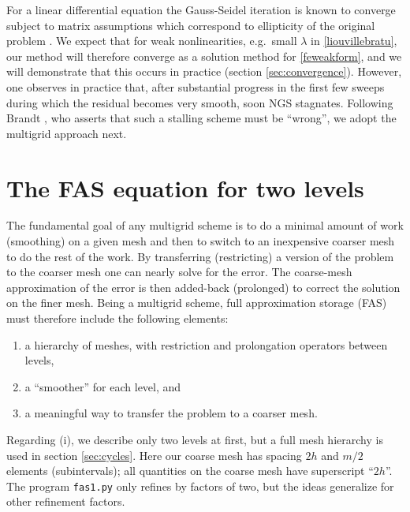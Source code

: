 \documentclass[letterpaper,final,12pt,reqno]{amsart}
\begin{document}
For a linear differential equation the Gauss-Seidel iteration is known to converge subject to matrix assumptions which correspond to ellipticity of the original problem \cite[for example]{Greenbaum1997}.  We expect that for weak nonlinearities, e.g.~small $\lambda$ in \eqref{liouvillebratu}, our method will therefore converge as a solution method for \eqref{feweakform}, and we will demonstrate that this occurs in practice (section \ref{sec:convergence}).  However, one observes in practice that, after substantial progress in the first few sweeps during which the residual becomes very smooth, soon NGS stagnates.  Following Brandt \cite{Brandt1977,BrandtLivne2011}, who asserts that such a stalling scheme must be ``wrong'', we adopt the multigrid approach next.


\section{The FAS equation for two levels}  \label{sec:fastwolevel}

The fundamental goal of any multigrid scheme is to do a minimal amount of work (smoothing) on a given mesh and then to switch to an inexpensive coarser mesh to do the rest of the work.  By transferring (restricting) a version of the problem to the coarser mesh one can nearly solve for the error.  The coarse-mesh approximation of the error is then added-back (prolonged) to correct the solution on the finer mesh.  Being a multigrid scheme, full approximation storage (FAS) \cite{Brandt1977,Briggsetal2000} must therefore include the following elements:
\renewcommand{\labelenumi}{(\roman{enumi})}
\begin{enumerate}
\item a hierarchy of meshes, with restriction and prolongation operators between levels,
\item a ``smoother'' for each level, and
\item a meaningful way to transfer the problem to a coarser mesh.
\end{enumerate}

Regarding (i), we describe only two levels at first, but a full mesh hierarchy is used in section \ref{sec:cycles}.  Here our coarse mesh has spacing $2h$ and $m/2$ elements (subintervals); all quantities on the coarse mesh have superscript ``$2h$''.  The program \texttt{fas1.py} only refines by factors of two, but the ideas generalize for other refinement factors.
\end{document}
